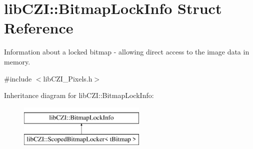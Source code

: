 \hypertarget{structlib_c_z_i_1_1_bitmap_lock_info}{}\section{lib\+C\+ZI\+:\+:Bitmap\+Lock\+Info Struct Reference}
\label{structlib_c_z_i_1_1_bitmap_lock_info}


Information about a locked bitmap -\/ allowing direct access to the image data in memory.  




{\ttfamily \#include $<$lib\+C\+Z\+I\+\_\+\+Pixels.\+h$>$}

Inheritance diagram for lib\+C\+ZI\+:\+:Bitmap\+Lock\+Info\+:\begin{figure}[H]
\begin{center}
\leavevmode
\includegraphics[height=2.000000cm]{structlib_c_z_i_1_1_bitmap_lock_info}
\end{center}
\end{figure}
